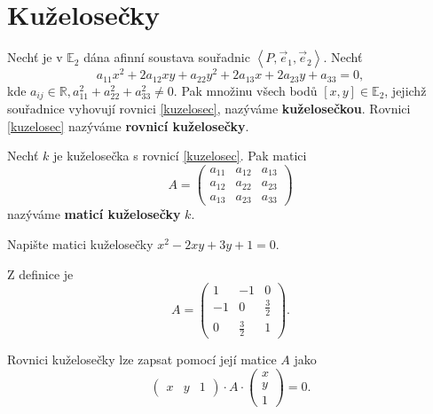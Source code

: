 \section{Kuželosečky}
\begin{definition}
    Nechť je v $\mathbb E_2$ dána afinní soustava souřadnic $\left<  P,\vec e_1, \vec e_2 \right> $.
    Nechť
    \begin{equation}\label{kuzelosec}
        a_{11}x^2+2a_{12}xy+a_{22}y^2+2a_{13}x+2a_{23}y+a_{33}=0,
    \end{equation}
    kde $a_{ij}\in \mathbb R, a_{11}^2 + a_{22}^2 + a_{33}^2\ne 0.$ Pak množinu všech
    bodů $[x,y] \in \mathbb E_2$, jejichž souřadnice vyhovují rovnici \ref{kuzelosec},
    nazýváme \textbf{kuželosečkou}. Rovnici \ref{kuzelosec} nazýváme \textbf{rovnicí kuželosečky}.
\end{definition}

\begin{definition}
    Nechť $k$ je kuželosečka s rovnicí \ref{kuzelosec}. Pak matici
    $$
        A = \begin{pmatrix}
            a_{11} & a_{12} & a_{13} \\
            a_{12} & a_{22} & a_{23} \\
            a_{13} & a_{23} & a_{33}
        \end{pmatrix}
    $$
    nazýváme \textbf{maticí kuželosečky} $k$.
\end{definition}

\begin{priklad}
Napište matici kuželosečky $x^2-2xy+3y+1=0.$
\end{priklad}
\begin{reseni}
Z definice je
$$
A = \begin{pmatrix}
    1 &-1 &0\\
    -1 &0 &\frac{3}{2}\\
    0 &\frac{3}{2} &1
\end{pmatrix}.
$$
\end{reseni}

\begin{pozn}
    Rovnici kuželosečky lze zapsat pomocí její matice $A$ jako
    $$\begin{pmatrix}
        x & y & 1
    \end{pmatrix}\cdot A \cdot \begin{pmatrix}
        x\\
        y\\
        1
    \end{pmatrix}=0.$$
\end{pozn}

